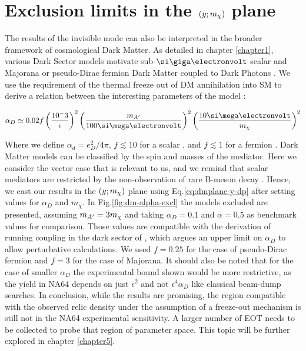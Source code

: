\FloatBarrier
\section{Exclusion limits in the $(y;m_{\chi})$ plane}
\label{ch4:sec:exclusion-limits-y}

The results of the invisible mode can also be interpreted in the broader framework of cosmological Dark Matter. As detailed in chapter \ref{chapter1}, various Dark Sector models motivate sub-$\gev$ scalar and Majorana or pseudo-Dirac fermion Dark Matter coupled to Dark Photons \cite{battaglieri2017cosmic}. We use the requirement of the thermal freeze out of DM annihilation into SM to derive a relation between the interesting parameters of the model \cite{na64-prd}:

\begin{equation}
  \label{eq:ad-freeze-out}
  \alpha_D \simeq 0.02 f\left(\frac{10^-3}{\epsilon}\right)^2\left(\frac{m_{\DM}}{100 \mev}\right)^2\left(\frac{10 \mev}{m_{\chi}}\right)^2
\end{equation}

Where we define $\alpha_d = e^2_D/4\pi$, $f\lesssim 10$ for a scalar \cite{deNiverville:2011it}, and $f\lesssim 1$ for a fermion \cite{PhysRevD.91.094026}. Dark Matter models can be classified by the spin and masses of the mediator. Here we consider the vector case that is relevant to us, and we remind that scalar mediators are restricted by the non-observation of rare B-meson decay \cite{battaglieri2017cosmic}. Hence, we cast our results in the $(y;m_{\chi})$ plane using Eq.\ref{eq:dmplane-y-dp} after setting values for $\alpha_D$ and $m_{\chi}$. In Fig.\ref{fig:dm-alpha-excl} the models excluded are presented, assuming $m_{A'} = 3m_{\chi}$ and taking $\alpha_D=0.1$ and $\alpha=0.5$ as benchmark values for comparison. Those values are compatible with the derivation of running coupling in the dark sector of \cite{Davoudiasl:2015hxa}, which argues an upper limit on $\alpha_D$ to allow perturbative calculations. We used $f=0.25$ for the case of pseudo-Dirac fermion and $f=3$ for the case of Majorana. It should also be noted that for the case of smaller $\alpha_D$ the experimental bound shown would be more restrictive, as the yield in NA64 depends on just $\epsilon^2$ and not $\epsilon^4 \alpha_D$ like classical beam-dump searches. In conclusion, while the results are promising, the region compatible with the observed relic density under the assumption of a freeze-out mechanism is still not in the NA64 experimental sensitivity. A larger number of EOT needs to be collected to probe that region of parameter space. This topic will be further explored in chapter \ref{chapter5}.

